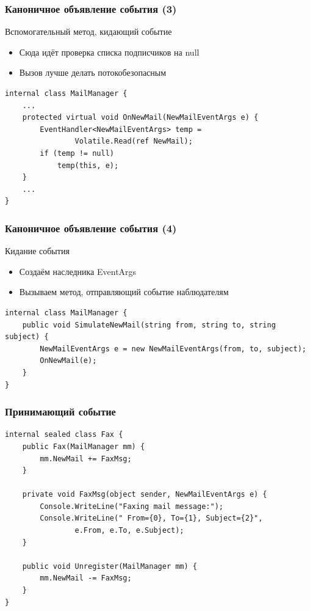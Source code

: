 \documentclass{../../slides-style}
\begin{document}
    \begin{frame}[fragile]
        \frametitle{Каноничное объявление события (3)}
        Вспомогательный метод, кидающий событие
        \begin{itemize}
            \item Сюда идёт проверка списка подписчиков на null
            \item Вызов лучше делать потокобезопасным
        \end{itemize}
        \vspace{5mm}
        \begin{verbatim}
internal class MailManager {
    ...
    protected virtual void OnNewMail(NewMailEventArgs e) {
        EventHandler<NewMailEventArgs> temp = 
                Volatile.Read(ref NewMail);
        if (temp != null) 
            temp(this, e);
    }
    ...
}
        \end{verbatim}
    \end{frame}

    \begin{frame}[fragile]
        \frametitle{Каноничное объявление события (4)}
        Кидание события
        \begin{itemize}
            \item Создаём наследника EventArgs
            \item Вызываем метод, отправляющий событие наблюдателям
        \end{itemize}
        \vspace{5mm}
        \begin{verbatim}
internal class MailManager {
    public void SimulateNewMail(string from, string to, string subject) {
        NewMailEventArgs e = new NewMailEventArgs(from, to, subject);
        OnNewMail(e);
    }
}
        \end{verbatim}
    \end{frame}

    \begin{frame}[fragile]
        \frametitle{Принимающий событие}
        \begin{verbatim}
internal sealed class Fax {
    public Fax(MailManager mm) {
        mm.NewMail += FaxMsg;
    }

    private void FaxMsg(object sender, NewMailEventArgs e) {
        Console.WriteLine("Faxing mail message:");
        Console.WriteLine(" From={0}, To={1}, Subject={2}",
                e.From, e.To, e.Subject);
    }

    public void Unregister(MailManager mm) {
        mm.NewMail -= FaxMsg;
    }
}
        \end{verbatim}
    \end{frame}
\end{document}
